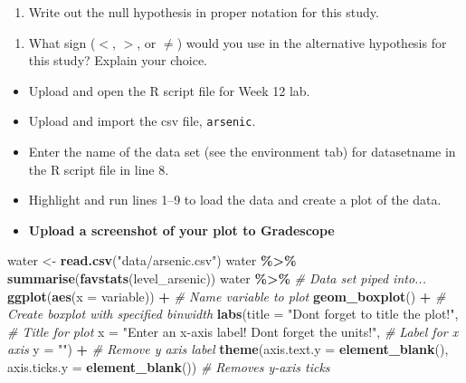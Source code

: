 \documentclass[
]{report}
\newenvironment{Shaded}{\begin{snugshade}}{\end{snugshade}}
\newcommand{\AttributeTok}[1]{\textcolor[rgb]{0.13,0.29,0.53}{#1}}
\newcommand{\CommentTok}[1]{\textcolor[rgb]{0.56,0.35,0.01}{\textit{#1}}}
\newcommand{\FunctionTok}[1]{\textcolor[rgb]{0.13,0.29,0.53}{\textbf{#1}}}
\newcommand{\NormalTok}[1]{#1}
\newcommand{\OtherTok}[1]{\textcolor[rgb]{0.56,0.35,0.01}{#1}}
\newcommand{\SpecialCharTok}[1]{\textcolor[rgb]{0.81,0.36,0.00}{\textbf{#1}}}
\newcommand{\StringTok}[1]{\textcolor[rgb]{0.31,0.60,0.02}{#1}}
\providecommand{\tightlist}{%
  \setlength{\itemsep}{0pt}\setlength{\parskip}{0pt}}
\begin{document}
\vspace{0.5in}

\begin{enumerate}
\def\labelenumi{\arabic{enumi}.}
\setcounter{enumi}{2}
\tightlist
\item
  Write out the null hypothesis in proper notation for this study.
\end{enumerate}

\vspace{0.4in}

\begin{enumerate}
\def\labelenumi{\arabic{enumi}.}
\setcounter{enumi}{3}
\tightlist
\item
  What sign (\(<\), \(>\), or \(\neq\)) would you use in the alternative hypothesis for this study? Explain your choice.
\end{enumerate}

\vspace{0.5in}

\begin{itemize}
\item
  Upload and open the R script file for Week 12 lab.
\item
  Upload and import the csv file, \texttt{arsenic}.
\item
  Enter the name of the data set (see the environment tab) for datasetname in the R script file in line 8.
\item
  Highlight and run lines 1--9 to load the data and create a plot of the data.
\item
  \textbf{Upload a screenshot of your plot to Gradescope}
\end{itemize}

\begin{Shaded}
\begin{Highlighting}[]
\NormalTok{water }\OtherTok{\textless{}{-}} \FunctionTok{read.csv}\NormalTok{(}\StringTok{"data/arsenic.csv"}\NormalTok{)}
\NormalTok{water }\SpecialCharTok{\%\textgreater{}\%}
    \FunctionTok{summarise}\NormalTok{(}\FunctionTok{favstats}\NormalTok{(level\_arsenic))}
\NormalTok{water }\SpecialCharTok{\%\textgreater{}\%} \CommentTok{\# Data set piped into...}
    \FunctionTok{ggplot}\NormalTok{(}\FunctionTok{aes}\NormalTok{(}\AttributeTok{x =}\NormalTok{ variable)) }\SpecialCharTok{+}   \CommentTok{\# Name variable to plot}
    \FunctionTok{geom\_boxplot}\NormalTok{() }\SpecialCharTok{+}  \CommentTok{\# Create boxplot with specified binwidth}
    \FunctionTok{labs}\NormalTok{(}\AttributeTok{title =} \StringTok{"Don\textquotesingle{}t forget to title the plot!"}\NormalTok{, }\CommentTok{\# Title for plot}
         \AttributeTok{x =} \StringTok{"Enter an x{-}axis label! Don\textquotesingle{}t forget the units!"}\NormalTok{, }\CommentTok{\# Label for x axis}
         \AttributeTok{y =} \StringTok{""}\NormalTok{) }\SpecialCharTok{+} \CommentTok{\# Remove y axis label}
    \FunctionTok{theme}\NormalTok{(}\AttributeTok{axis.text.y =} \FunctionTok{element\_blank}\NormalTok{(), }
          \AttributeTok{axis.ticks.y =} \FunctionTok{element\_blank}\NormalTok{()) }\CommentTok{\# Removes y{-}axis ticks}
\end{Highlighting}
\end{Shaded}
\end{document}
